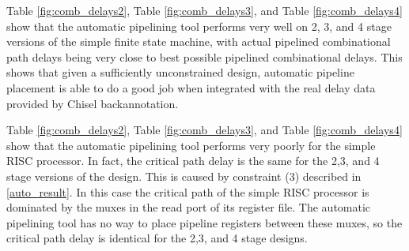 Table \ref{fig:comb_delays2}, Table \ref{fig:comb_delays3}, and Table \ref{fig:comb_delays4} show that the automatic pipelining tool performs very well on 2, 3, and 4 stage versions of the simple finite state machine, with actual pipelined combinational path delays being very close to best possible pipelined combinational delays.  This shows that given a sufficiently unconstrained design, automatic pipeline placement is able to do a good job when integrated with the real delay data provided by Chisel backannotation.

Table \ref{fig:comb_delays2}, Table \ref{fig:comb_delays3}, and Table \ref{fig:comb_delays4} show that the automatic pipelining tool performs very poorly for the simple RISC processor. In fact, the critical path delay is the same for the 2,3, and 4 stage versions of the design. This is caused by constraint (3) described in \ref{auto_result}. In this case the critical path of the simple RISC processor is dominated by the muxes in the read port of its register file. The automatic pipelining tool has no way to place pipeline registers between these muxes, so the critical path delay is identical for the 2,3, and 4 stage designs.

